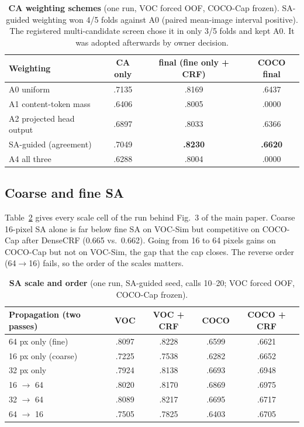 \begin{table}[t]
\centering
\footnotesize\setlength{\tabcolsep}{3pt}
\begin{tabular}{@{}lccc@{}}
\toprule
Weighting & CA only & final (fine only + CRF) & COCO final \\
\midrule
A0 uniform & .7135 & .8169 & .6437 \\
A1 content-token mass & .6406 & .8005 & .0000 \\
A2 projected head output & .6897 & .8033 & .6366 \\
SA-guided (agreement) & .7049 & \textbf{.8230} & \textbf{.6620} \\
A4 all three & .6288 & .8004 & .0000 \\
\bottomrule
\end{tabular}
\caption{\textbf{CA weighting schemes} (one run, VOC forced OOF, COCO-Cap frozen). SA-guided weighting won 4/5 folds against A0 (paired mean-image interval positive). The registered multi-candidate screen chose it in only 3/5 folds and kept A0. It was adopted afterwards by owner decision.}
\label{tab:supp_sg24}
\end{table}

\subsection{Coarse and fine SA}
Table~\ref{tab:supp_sg25} gives every scale cell of the run behind Fig.~3 of the main paper. Coarse 16-pixel SA alone is far below fine SA on VOC-Sim but competitive on COCO-Cap after DenseCRF (0.665 vs.\ 0.662). Going from 16 to 64 pixels gains on COCO-Cap but not on VOC-Sim, the gap that the cap closes. The reverse order (64$\rightarrow$16) fails, so the order of the scales matters.

\begin{table}[t]
\centering
\footnotesize\setlength{\tabcolsep}{3pt}
\begin{tabular}{@{}lcccc@{}}
\toprule
Propagation (two passes) & VOC & VOC + CRF & COCO & COCO + CRF \\
\midrule
64 px only (fine) & .8097 & .8228 & .6599 & .6621 \\
16 px only (coarse) & .7225 & .7538 & .6282 & .6652 \\
32 px only & .7924 & .8138 & .6693 & .6948 \\
16 $\rightarrow$ 64 & .8020 & .8170 & .6869 & .6975 \\
32 $\rightarrow$ 64 & .8089 & .8217 & .6695 & .6717 \\
64 $\rightarrow$ 16 & .7505 & .7825 & .6403 & .6705 \\
\bottomrule
\end{tabular}
\caption{\textbf{SA scale and order} (one run, SA-guided seed, calls 10--20; VOC forced OOF, COCO-Cap frozen).}
\label{tab:supp_sg25}
\end{table}


